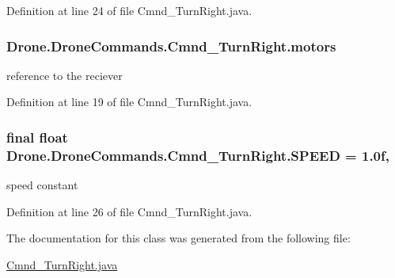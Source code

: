 Definition at line 24 of file Cmnd\+\_\+\+Turn\+Right.\+java.

\hypertarget{class_drone_1_1_drone_commands_1_1_cmnd___turn_right_a180525c1b0947c875771675d16f6de5c}{}
\subsubsection[{motors}]{ Drone.\+Drone\+Commands.\+Cmnd\+\_\+\+Turn\+Right.\+motors\hspace{0.3cm}{\ttfamily [private]}}\label{class_drone_1_1_drone_commands_1_1_cmnd___turn_right_a180525c1b0947c875771675d16f6de5c}
reference to the reciever 

Definition at line 19 of file Cmnd\+\_\+\+Turn\+Right.\+java.

\hypertarget{class_drone_1_1_drone_commands_1_1_cmnd___turn_right_a7d3f195015dd0158fd0405865b3c8851}{}
\subsubsection[{S\+P\+E\+E\+D}]{\setlength{\rightskip}{0pt plus 5cm}final float Drone.\+Drone\+Commands.\+Cmnd\+\_\+\+Turn\+Right.\+S\+P\+E\+E\+D = 1.\+0f\hspace{0.3cm}{\ttfamily [static]}, {\ttfamily [private]}}\label{class_drone_1_1_drone_commands_1_1_cmnd___turn_right_a7d3f195015dd0158fd0405865b3c8851}
speed constant 

Definition at line 26 of file Cmnd\+\_\+\+Turn\+Right.\+java.



The documentation for this class was generated from the following file\+:\begin{DoxyCompactItemize}
\item 
\hyperlink{_cmnd___turn_right_8java}{Cmnd\+\_\+\+Turn\+Right.\+java}\end{DoxyCompactItemize}
